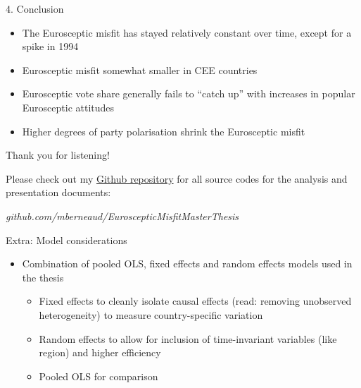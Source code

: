 \begin{frame}{4. Conclusion}

\begin{itemize}
\tightlist
\item
  The Eurosceptic misfit has stayed relatively constant over time,
  except for a spike in 1994
\item
  Eurosceptic misfit somewhat smaller in CEE countries
\item
  Eurosceptic vote share generally fails to ``catch up'' with increases
  in popular Eurosceptic attitudes
\item
  Higher degrees of party polarisation shrink the Eurosceptic misfit
\end{itemize}

\end{frame}

\begin{frame}{Thank you for listening!}

Please check out my
\href{https://github.com/mberneaud/EuroscepticMisfitMasterThesis}{Github
repository} for all source codes for the analysis and presentation
documents:

\emph{github.com/mberneaud/EuroscepticMisfitMasterThesis}

\end{frame}

\begin{frame}{Extra: Model considerations}

\begin{itemize}
\tightlist
\item
  Combination of pooled OLS, fixed effects and random effects models
  used in the thesis

  \begin{itemize}
  \tightlist
  \item
    Fixed effects to cleanly isolate causal effects (read: removing
    unobserved heterogeneity) to measure country-specific variation
  \item
    Random effects to allow for inclusion of time-invariant variables
    (like region) and higher efficiency
  \item
    Pooled OLS for comparison
  \end{itemize}
\end{itemize}

\end{frame}
